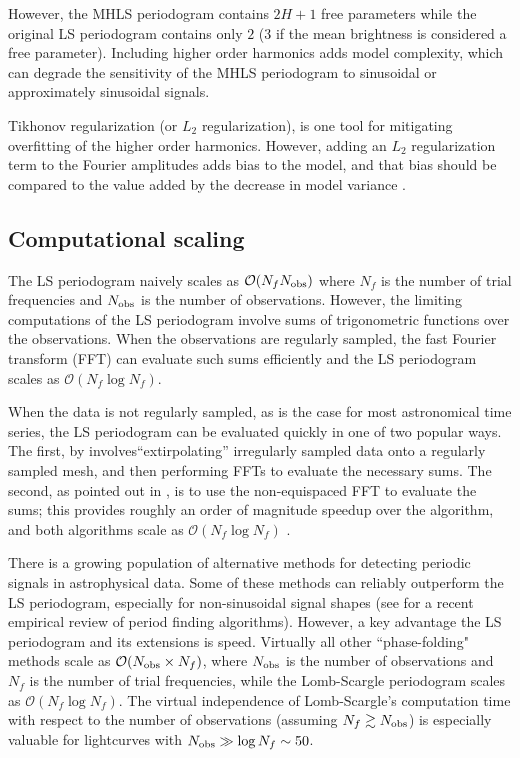\documentclass[apj]{emulateapj}
\newcommand{\bigO}{\mathcal{O}}
\begin{document}
However, the MHLS periodogram contains $2H+1$ free parameters while the original LS periodogram
contains only $2$ ($3$ if the mean brightness is considered a free parameter). Including higher order
harmonics adds model complexity, which can degrade the sensitivity of the MHLS periodogram to
sinusoidal or approximately sinusoidal signals.

Tikhonov regularization (or $L_2$ regularization), is one tool for mitigating overfitting
of the higher order harmonics. However, adding an $L_2$ regularization term to the Fourier amplitudes
adds bias to the model, and that bias should be compared to the value added by the
decrease in model variance \citep{Vanderplas+Ivezic_2015}.

\subsection{Computational scaling}

The LS periodogram naively scales as $\bigO(N_f N_{\rm obs})$ where $N_f$ is the number of trial
frequencies and $N_{\rm obs}$ is the number of observations. However, the limiting computations
of the LS periodogram involve sums of trigonometric functions over the observations. When
the observations are regularly sampled, the fast Fourier transform (FFT)  \citep{Cooley+Tukey_1965}
can evaluate such sums efficiently and the LS periodogram scales as $\bigO(N_f\log N_f)$.

When the data is not regularly sampled, as is the case for most astronomical time series,
the LS periodogram can be evaluated quickly in one of two popular ways.
The first, by \cite{Press+Rybicki_1989} involves``extirpolating'' irregularly sampled
data onto a regularly sampled mesh, and then performing FFTs to evaluate the necessary sums.
The second, as pointed out in \cite{Leroy_2012}, is to use the non-equispaced FFT \citep[][NFFT]{NFFT_KKD2009,NFFT_DR1993}
to evaluate the sums; this provides roughly an order of magnitude speedup over the \cite{Press+Rybicki_1989}
algorithm, and both algorithms scale as $\bigO(N_f\log N_f)$ \citep{Leroy_2012}.

There is a growing population of alternative methods for detecting
periodic signals in astrophysical data. Some of these methods can reliably
outperform the LS periodogram, especially for non-sinusoidal signal shapes
(see \cite{Graham_etal_2013} for a recent empirical review of period finding algorithms).
However, a key advantage the LS periodogram and its extensions is speed.
Virtually all other ``phase-folding" methods scale as $\bigO(N_{\rm obs}\times N_f)$, where $N_{\rm obs}$ is the number
of observations and $N_f$ is the number of trial frequencies, while the Lomb-Scargle
periodogram scales as $\bigO(N_f\log N_f)$. The virtual independence of Lomb-Scargle's computation
time with respect to the number of observations (assuming $N_f \gtrsim N_{\rm obs}$)
is especially valuable for lightcurves with $N_{\rm obs} \gg \log N_f \sim 50$.
\end{document}
